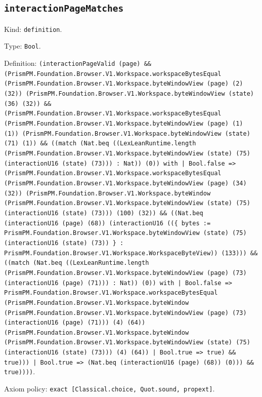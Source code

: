 \documentclass[11pt]{article}
\begin{document}
\subsection*{\texttt{interactionPageMatches}}
\noindent Kind: \texttt{definition}.\par
\noindent Type: \texttt{Bool}.\par
\noindent Definition: \texttt{(interactionPageValid (page) \&\& (PrismPM.Foundation.Browser.V1.Workspace.workspaceBytesEqual (PrismPM.Foundation.Browser.V1.Workspace.byteWindowView (page) (2) (32)) (PrismPM.Foundation.Browser.V1.Workspace.byteWindowView (state) (36) (32)) \&\& (PrismPM.Foundation.Browser.V1.Workspace.workspaceBytesEqual (PrismPM.Foundation.Browser.V1.Workspace.byteWindowView (page) (1) (1)) (PrismPM.Foundation.Browser.V1.Workspace.byteWindowView (state) (71) (1)) \&\& ((match (Nat.beq ((LexLeanRuntime.length (PrismPM.Foundation.Browser.V1.Workspace.byteWindowView (state) (75) (interactionU16 (state) (73))) : Nat)) (0)) with | Bool.false => (PrismPM.Foundation.Browser.V1.Workspace.workspaceBytesEqual (PrismPM.Foundation.Browser.V1.Workspace.byteWindowView (page) (34) (32)) (PrismPM.Foundation.Browser.V1.Workspace.byteWindow (PrismPM.Foundation.Browser.V1.Workspace.byteWindowView (state) (75) (interactionU16 (state) (73))) (100) (32)) \&\& ((Nat.beq (interactionU16 (page) (68)) (interactionU16 ((\{ bytes := PrismPM.Foundation.Browser.V1.Workspace.byteWindowView (state) (75) (interactionU16 (state) (73)) \} : PrismPM.Foundation.Browser.V1.Workspace.WorkspaceByteView)) (133))) \&\& ((match (Nat.beq ((LexLeanRuntime.length (PrismPM.Foundation.Browser.V1.Workspace.byteWindowView (page) (73) (interactionU16 (page) (71))) : Nat)) (0)) with | Bool.false => PrismPM.Foundation.Browser.V1.Workspace.workspaceBytesEqual (PrismPM.Foundation.Browser.V1.Workspace.byteWindow (PrismPM.Foundation.Browser.V1.Workspace.byteWindowView (page) (73) (interactionU16 (page) (71))) (4) (64)) (PrismPM.Foundation.Browser.V1.Workspace.byteWindow (PrismPM.Foundation.Browser.V1.Workspace.byteWindowView (state) (75) (interactionU16 (state) (73))) (4) (64)) | Bool.true => true) \&\& true))) | Bool.true => (Nat.beq (interactionU16 (page) (68)) (0))) \&\& true))))}.\par
\noindent Axiom policy: \texttt{exact [Classical.choice, Quot.sound, propext]}.\par
\end{document}
